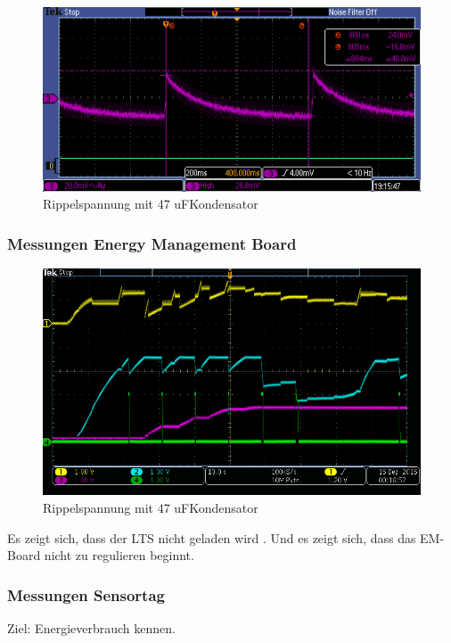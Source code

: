 \begin{figure}
\includegraphics[bb = 0 0 100 100]{3Vorgehen/imag/47uF.PNG}
\caption{Rippelspannung mit 47 uFKondensator}\label{kond47uF} 
\end{figure}


\subsubsection{Messungen Energy Management Board}

\begin{figure}
\includegraphics[bb = 0 0 100 100]{3Vorgehen/imag/messungPA.png}
\caption{Rippelspannung mit 47 uFKondensator}
\end{figure}
Es zeigt sich, dass der LTS nicht geladen wird . Und es zeigt sich, dass das EM-Board nicht zu regulieren beginnt.








\pagebreak
\subsubsection{Messungen Sensortag}
Ziel: Energieverbrauch kennen.

